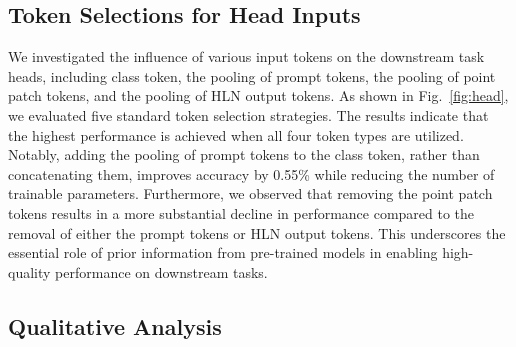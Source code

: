 \subsection{Token Selections for Head Inputs}  
We investigated the influence of various input tokens on the downstream task heads, including class token, the pooling of prompt tokens, the pooling of point patch tokens, and the pooling of HLN output tokens. As shown in Fig.~\ref{fig:head}, we evaluated five standard token selection strategies. The results indicate that the highest performance is achieved when all four token types are utilized. Notably, adding the pooling of prompt tokens to the class token, rather than concatenating them, improves accuracy by 0.55\% while reducing the number of trainable parameters. Furthermore, we observed that removing the point patch tokens results in a more substantial decline in performance compared to the removal of either the prompt tokens or HLN output tokens. This underscores the essential role of prior information from pre-trained models in enabling high-quality performance on downstream tasks.

\subsection{Qualitative Analysis}




